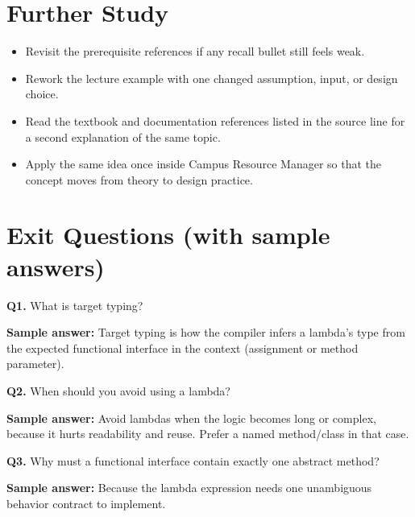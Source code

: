\documentclass[11pt]{article}
\begin{document}
\section{Further Study}
\begin{itemize}
  \item Revisit the prerequisite references if any recall bullet still feels weak.
  \item Rework the lecture example with one changed assumption, input, or design choice.
  \item Read the textbook and documentation references listed in the source line for a second explanation of the same topic.
  \item Apply the same idea once inside Campus Resource Manager so that the concept moves from theory to design practice.
\end{itemize}
\notesources{\OOPSUnitIVSources}

\section{Exit Questions (with sample answers)}
\textbf{Q1.} What is target typing?\par
\textbf{Sample answer:} Target typing is how the compiler infers a lambda's type from the expected functional interface in the context (assignment or method parameter).

\vspace{0.6em}
\textbf{Q2.} When should you avoid using a lambda?\par
\textbf{Sample answer:} Avoid lambdas when the logic becomes long or complex, because it hurts readability and reuse. Prefer a named method/class in that case.

\vspace{0.6em}
\textbf{Q3.} Why must a functional interface contain exactly one abstract method?\par
\textbf{Sample answer:} Because the lambda expression needs one unambiguous behavior contract to implement.
\end{document}
